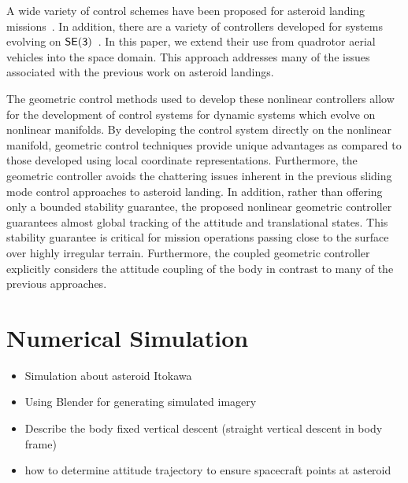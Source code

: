 \documentclass[letterpaper, paper,11pt]{AAS}		%
\begin{document}
A wide variety of control schemes have been proposed for asteroid landing missions~\cite{furfaro2013,li2011a}.
In addition, there are a  variety of controllers developed for systems evolving on \( \mathsf{SE(3)} \)~\cite{lee2010c, goodarzi2015}.
In this paper, we extend their use from quadrotor aerial vehicles into the space domain. 
This approach addresses many of the issues associated with the previous work on asteroid landings.

The geometric control methods used to develop these nonlinear controllers allow for the development of control systems for dynamic systems which evolve on nonlinear manifolds. 
By developing the control system directly on the nonlinear manifold, geometric control techniques provide unique advantages as compared to those developed using local coordinate representations.
Furthermore, the geometric controller avoids the chattering issues inherent in the previous sliding mode control approaches to asteroid landing.
In addition, rather than offering only a bounded stability guarantee, the proposed nonlinear geometric controller guarantees almost global tracking of the attitude and translational states. 
This stability guarantee is critical for mission operations passing close to the surface over highly irregular terrain.
Furthermore, the coupled geometric controller explicitly considers the attitude coupling of the body in contrast to many of the previous approaches.

\section{Numerical Simulation}\label{sec:simulation}

\begin{itemize}
    \item Simulation about asteroid Itokawa
    \item Using Blender for generating simulated imagery
    \item Describe the body fixed vertical descent (straight vertical descent in body frame)
    \item how to determine attitude trajectory to ensure spacecraft points at asteroid
\end{itemize}
\end{document}
